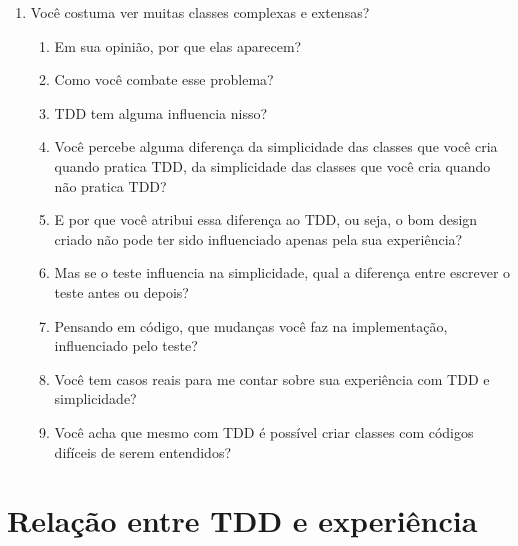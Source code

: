 \begin{enumerate}
	\item{Você costuma ver muitas classes complexas e extensas?}
		\begin{enumerate}
			\item Em sua opinião, por que elas aparecem?

			\item Como você combate esse problema?

			\item TDD tem alguma influencia nisso?
			
			\item Você percebe alguma diferença da simplicidade das classes que você cria quando
			pratica TDD, da simplicidade das classes que você cria quando não pratica TDD?
			
			\item E por que você atribui essa diferença ao TDD, ou seja, o bom design
			criado não pode ter sido influenciado apenas pela sua experiência?
			
			\item Mas se o teste influencia na simplicidade, 
			qual a diferença entre escrever o teste antes ou depois?
			
			\item Pensando em código, que mudanças você faz na implementação, influenciado
			pelo teste?

			\item Você tem casos reais para me contar sobre sua experiência com TDD e 
			simplicidade?
			
			\item Você acha que mesmo com TDD é possível criar classes com códigos difíceis de serem entendidos? 

		\end{enumerate}
\end{enumerate}

\section{Relação entre TDD e experiência}
\label{entrevista:experiencia}

